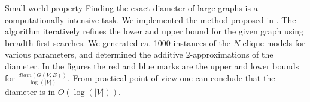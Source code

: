 \begin{block}{Small-world property}\small
Finding the exact diameter of large graphs is a computationally intensive task. We implemented the method proposed in \cite{CreMa}. The algorithm iteratively refines the lower and upper bound for the given graph using breadth first searches. We generated ca. 1000 instances of the $N$-clique models for various parameters, and determined the additive $2$-approximations of the diameter. In the figures the red and blue marks are the upper and lower bounds for $\frac{diam(G(V,E))}{\log(|V|)}$. From practical point of view one can conclude that the diameter is in $O(\log(|V|))$.
\end{block}


